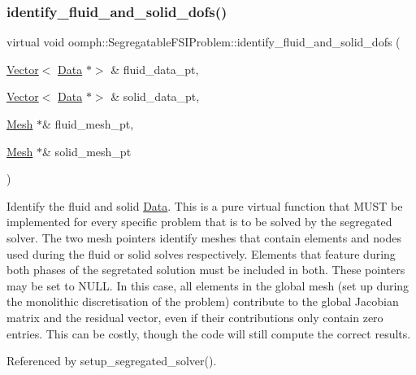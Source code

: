 \subsubsection{\texorpdfstring{identify\+\_\+fluid\+\_\+and\+\_\+solid\+\_\+dofs()}{identify\_fluid\_and\_solid\_dofs()}}
{\footnotesize\ttfamily virtual void oomph\+::\+Segregatable\+F\+S\+I\+Problem\+::identify\+\_\+fluid\+\_\+and\+\_\+solid\+\_\+dofs (\begin{DoxyParamCaption}\item[{\hyperlink{classoomph_1_1Vector}{Vector}$<$ \hyperlink{classoomph_1_1Data}{Data} $\ast$$>$ \&}]{fluid\+\_\+data\+\_\+pt,  }\item[{\hyperlink{classoomph_1_1Vector}{Vector}$<$ \hyperlink{classoomph_1_1Data}{Data} $\ast$$>$ \&}]{solid\+\_\+data\+\_\+pt,  }\item[{\hyperlink{classoomph_1_1Mesh}{Mesh} $\ast$\&}]{fluid\+\_\+mesh\+\_\+pt,  }\item[{\hyperlink{classoomph_1_1Mesh}{Mesh} $\ast$\&}]{solid\+\_\+mesh\+\_\+pt }\end{DoxyParamCaption})\hspace{0.3cm}{\ttfamily [pure virtual]}}



Identify the fluid and solid \hyperlink{classoomph_1_1Data}{Data}. This is a pure virtual function that M\+U\+ST be implemented for every specific problem that is to be solved by the segregated solver. The two mesh pointers identify meshes that contain elements and nodes used during the fluid or solid solves respectively. Elements that feature during both phases of the segretated solution must be included in both. These pointers may be set to N\+U\+LL. In this case, all elements in the global mesh (set up during the monolithic discretisation of the problem) contribute to the global Jacobian matrix and the residual vector, even if their contributions only contain zero entries. This can be costly, though the code will still compute the correct results. 



Referenced by setup\+\_\+segregated\+\_\+solver().

\mbox{\label{classoomph_1_1SegregatableFSIProblem_a33397ef8c5410b782cc9801979812be0}} 
